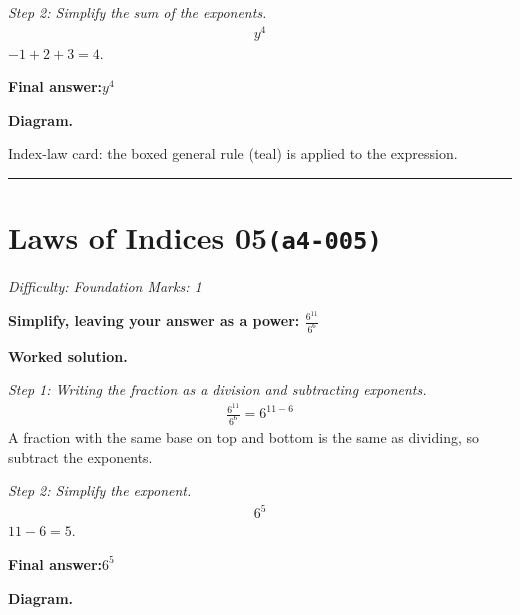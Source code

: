 \documentclass[11pt]{article}
\newcommand{\question}[1]{\par\medskip\noindent\textbf{#1}\par}
\begin{document}
\textit{Step 2: Simplify the sum of the exponents.}
\[\begin{gathered}
y^{4}
\end{gathered}\]
\( -1 + 2 + 3 = 4 \).

\begin{answerbox}
\textbf{Final answer:}\quad \(\displaystyle y^{4}\)
\end{answerbox}
\textbf{Diagram.}

\begin{center}
\end{center}
\small Index-law card: the boxed general rule (teal) is applied to the expression.\normalsize

\medskip\hrule

\section*{Laws of Indices 05\quad\small\texttt{(a4-005)}}
\textit{Difficulty: Foundation \quad\textbar\quad Marks: 1}

\question{Simplify, leaving your answer as a power: \( \frac{6^{11}}{6^6} \)}

\textbf{Worked solution.}

\textit{Step 1: Writing the fraction as a division and subtracting exponents.}
\[\begin{gathered}
\frac{6^{11}}{6^6} = 6^{11-6}
\end{gathered}\]
A fraction with the same base on top and bottom is the same as dividing, so subtract the exponents.

\textit{Step 2: Simplify the exponent.}
\[\begin{gathered}
6^{5}
\end{gathered}\]
\( 11 - 6 = 5 \).

\begin{answerbox}
\textbf{Final answer:}\quad \(\displaystyle 6^{5}\)
\end{answerbox}
\textbf{Diagram.}
\end{document}
